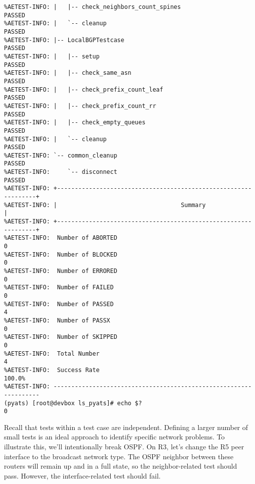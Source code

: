 \begin{verbatim}
%AETEST-INFO: |   |-- check_neighbors_count_spines                        PASSED
%AETEST-INFO: |   `-- cleanup                                             PASSED
%AETEST-INFO: |-- LocalBGPTestcase                                        PASSED
%AETEST-INFO: |   |-- setup                                               PASSED
%AETEST-INFO: |   |-- check_same_asn                                      PASSED
%AETEST-INFO: |   |-- check_prefix_count_leaf                             PASSED
%AETEST-INFO: |   |-- check_prefix_count_rr                               PASSED
%AETEST-INFO: |   |-- check_empty_queues                                  PASSED
%AETEST-INFO: |   `-- cleanup                                             PASSED
%AETEST-INFO: `-- common_cleanup                                          PASSED
%AETEST-INFO:     `-- disconnect                                          PASSED
%AETEST-INFO: +----------------------------------------------------------------+
%AETEST-INFO: |                                   Summary                      |
%AETEST-INFO: +----------------------------------------------------------------+
%AETEST-INFO:  Number of ABORTED                                              0
%AETEST-INFO:  Number of BLOCKED                                              0
%AETEST-INFO:  Number of ERRORED                                              0
%AETEST-INFO:  Number of FAILED                                               0
%AETEST-INFO:  Number of PASSED                                               4
%AETEST-INFO:  Number of PASSX                                                0
%AETEST-INFO:  Number of SKIPPED                                              0
%AETEST-INFO:  Total Number                                                   4
%AETEST-INFO:  Success Rate                                              100.0%
%AETEST-INFO: ------------------------------------------------------------------
(pyats) [root@devbox ls_pyats]# echo $?
0
\end{verbatim}

Recall that tests within a test case are independent. Defining a larger number
of small tests is an ideal approach to identify specific network problems. To
illustrate this, we'll intentionally break OSPF\@. On R3, let's change the R5 peer
interface to the broadcast network type. The OSPF neighbor between these routers
will remain up and in a full state, so the neighbor-related test should pass.
However, the interface-related test should fail.

